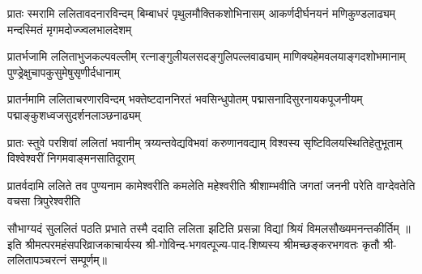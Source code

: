 
\fourlineindentedshloka
{प्रातः स्मरामि ललितावदनारविन्दम्}
{बिम्बाधरं पृथुलमौक्तिकशोभिनासम्}
{आकर्णदीर्घनयनं मणिकुण्डलाढ्यम्}
{मन्दस्मितं मृगमदोज्ज्वलभालदेशम्}

\fourlineindentedshloka
{प्रातर्भजामि ललिताभुजकल्पवल्लीम्}
{रत्नाङ्गुलीयलसदङ्गुलिपल्लवाढ्याम्}
{माणिक्यहेमवलयाङ्गदशोभमानाम्}
{पुण्ड्रेक्षुचापकुसुमेषुसृणीर्दधानाम्}

\fourlineindentedshloka
{प्रातर्नमामि ललिताचरणारविन्दम्}
{भक्तेष्टदाननिरतं भवसिन्धुपोतम्}
{पद्मासनादिसुरनायकपूजनीयम्}
{पद्माङ्कुशध्वजसुदर्शनलाञ्छनाढ्यम्}

\fourlineindentedshloka
{प्रातः स्तुवे परशिवां ललितां भवानीम्}
{त्रय्यन्तवेद्यविभवां करुणानवद्याम्}
{विश्वस्य सृष्टिविलयस्थितिहेतुभूताम्}
{विश्वेश्वरीं निगमवाङ्मनसातिदूराम्}

\fourlineindentedshloka
{प्रातर्वदामि ललिते तव पुण्यनाम}
{कामेश्वरीति कमलेति महेश्वरीति}
{श्रीशाम्भवीति जगतां जननी परेति}
{वाग्देवतेति वचसा त्रिपुरेश्वरीति}

{सौभाग्यदं सुललितं पठति प्रभाते}
{तस्मै ददाति ललिता झटिति प्रसन्ना}
{विद्यां श्रियं विमलसौख्यमनन्तकीर्तिम्}
॥इति श्रीमत्परमहंसपरिव्राजकाचार्यस्य श्री-गोविन्द-भगवत्पूज्य-पाद-शिष्यस्य
श्रीमच्छङ्करभगवतः कृतौ  श्री-ललितापञ्चरत्नं सम्पूर्णम्॥